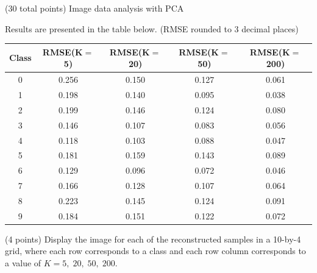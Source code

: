 \documentclass[12pt]{article}
\begin{document}
\begin{question}{(30 total points) Image data analysis with PCA}
\begin{subquestion}
     

      \begin{answerbox}{25em}
         Results are presented in the table below. (RMSE rounded to 3 decimal places)
         \begin{center}
         \begin{tabular}{|c|c|c|c|c|}
         \hline
         Class & RMSE(K$=$5) & RMSE(K$=$20) & RMSE(K$=$50) & RMSE(K$=$200)\\
         \hline
         0 & 0.256 & 0.150 & 0.127 & 0.061 \\
         1 & 0.198 & 0.140 & 0.095 & 0.038 \\
         2 & 0.199 & 0.146 & 0.124 & 0.080 \\
         3 & 0.146 & 0.107 & 0.083 & 0.056 \\
         4 & 0.118 & 0.103 & 0.088 & 0.047 \\
         5 & 0.181 & 0.159 & 0.143 & 0.089 \\
         6 & 0.129 & 0.096 & 0.072 & 0.046 \\
         7 & 0.166 & 0.128 & 0.107 & 0.064 \\
         8 & 0.223 & 0.145 & 0.124 & 0.091 \\
         9 & 0.184 & 0.151 & 0.122 & 0.072 \\
         \hline
         \end{tabular}
         \end{center}
    \end{answerbox}
  


   \end{subquestion}
   
   \begin{subquestion}{(4 points)
       Display the image for each of the reconstructed samples in
       a 10-by-4 grid, where each row corresponds to a class and
       each row column corresponds to a value of $K=5, \; 20, \; 50, \; 200$.
     } \label{Q1.7}


   


\end{subquestion}
\end{question}
\end{document}
